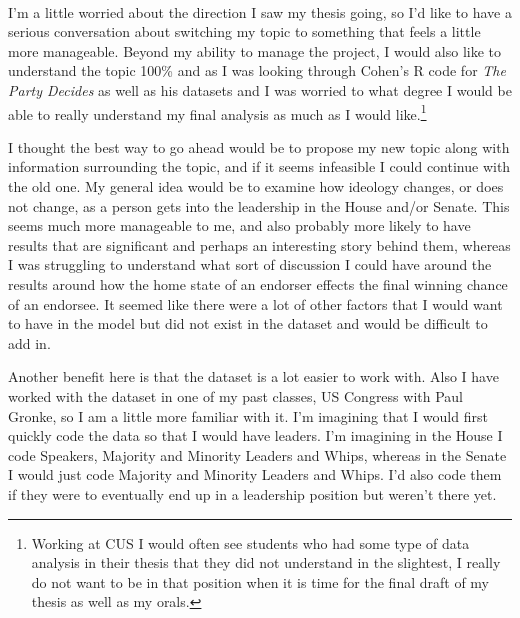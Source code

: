 \documentclass[10pt]{article}
\begin{document}
	
	
	
	
 \\

    
\bigskip 


\justify \onehalfspacing

I'm a little worried about the direction I saw my thesis going, so I'd like to have a serious conversation about switching my topic to something that feels a little more manageable. Beyond my ability to manage the project, I would also like to understand the topic 100\% and as I was looking through Cohen's R code for \emph{The Party Decides} as well as his datasets and I was worried to what degree I would be able to really understand my final analysis as much as I would like.\footnote{Working at CUS I would often see students who had some type of data analysis in their thesis that they did not understand in the slightest, I really do not want to be in that position when it is time for the final draft of my thesis as well as my orals.}

I thought the best way to go ahead would be to propose my new topic along with information surrounding the topic, and if it seems infeasible I could continue with the old one. My general idea would be to examine how ideology changes, or does not change, as a person gets into the leadership in the House and/or Senate. This seems much more manageable to me, and also probably more likely to have results that are significant and perhaps an interesting story behind them, whereas I was struggling to understand what sort of discussion I could have around the results around how the home state of an endorser effects the final winning chance of an endorsee. It seemed like there were a lot of other factors that I would want to have in the model but did not exist in the dataset and would be difficult to add in.

Another benefit here is that the dataset is a lot easier to work with. Also I have worked with the dataset in one of my past classes, US Congress with Paul Gronke, so I am a little more familiar with it. I'm imagining that I would first quickly code the data so that I would have leaders. I'm imagining in the House I code Speakers, Majority and Minority Leaders and Whips, whereas in the Senate I would just code Majority and Minority Leaders and Whips. I'd also code them if they were to eventually end up in a leadership position but weren't there yet.
\end{document}

